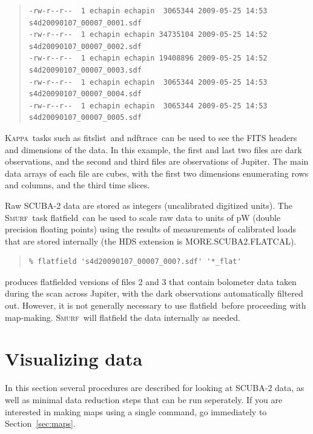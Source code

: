 \documentclass[twoside,11pt]{article}
\newenvironment{myquote}{\begin{quote}\begin{small}}{\end{small}\end{quote}}
\newcommand{\Kappa}{\xref{\textsc{Kappa}}{sun95}{}}
\newcommand{\smurf}{\xref{\textsc{Smurf}}{sun258}{}}
\newcommand{\task}[1]{\textsf{#1}}
\newcommand{\flatfield}{\xref{\task{flatfield}}{sun258}{FLATFIELD}}
\newcommand{\fitslist}{\xref{\task{fitslist}}{sun95}{FITSLIST}}
\newcommand{\ndftrace}{\xref{\task{ndftrace}}{sun95}{NDFTRACE}}
\newcommand{\xref}[3]{#1}
\newcommand{\xlabel}[1]{}
\renewcommand{\_}{\texttt{\symbol{95}}}
\begin{document}
\begin{myquote}
\begin{verbatim}
-rw-r--r--  1 echapin echapin  3065344 2009-05-25 14:53 s4d20090107_00007_0001.sdf
-rw-r--r--  1 echapin echapin 34735104 2009-05-25 14:52 s4d20090107_00007_0002.sdf
-rw-r--r--  1 echapin echapin 19408896 2009-05-25 14:52 s4d20090107_00007_0003.sdf
-rw-r--r--  1 echapin echapin  3065344 2009-05-25 14:53 s4d20090107_00007_0004.sdf
-rw-r--r--  1 echapin echapin  3065344 2009-05-25 14:53 s4d20090107_00007_0005.sdf
\end{verbatim}
\end{myquote}

\Kappa\ tasks such as \fitslist\ and \ndftrace\ can be used to see the
FITS headers and dimensions of the data. In this example, the first
and last two files are dark observations, and the second and third
files are observations of Jupiter. The main data arrays of each file
are cubes, with the first two dimensions enumerating rows and columns,
and the third time slices.

Raw SCUBA-2 data are stored as integers (uncalibrated digitized
units). The \smurf\ task \flatfield\ can be used to scale raw data to
units of pW (double precision floating points) using the results of
measurements of calibrated loads that are stored internally (the HDS
extension is MORE.SCUBA2.FLATCAL).

\begin{myquote}
\begin{verbatim}
% flatfield 's4d20090107_00007_000?.sdf' '*_flat'
\end{verbatim}
\end{myquote}

produces flatfielded versions of files 2 and 3 that contain bolometer
data taken during the scan across Jupiter, with the dark observations
automatically filtered out. However, it is not generally necessary to
use \flatfield\ before proceeding with map-making. \smurf\ will
flatfield the data internally as needed.

\section{\xlabel{time_series}Visualizing data}

In this section several procedures are described for looking at
SCUBA-2 data, as well as minimal data reduction steps that can be run
seperately. If you are interested in making maps using a single
command, go immediately to Section~\ref{sec:maps}.
\end{document}
